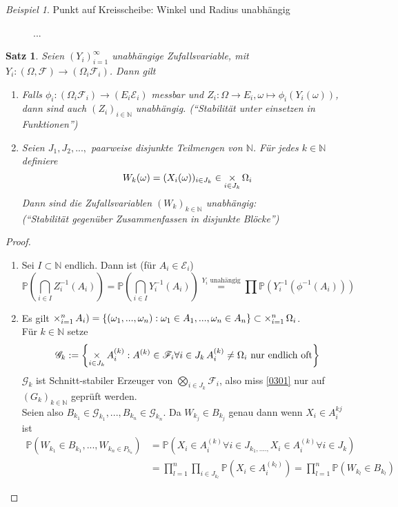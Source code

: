 \documentclass[10pt,a4paper]{article}
\newcommand{\N}{\ensuremath{\mathbb{N}}}
\newcommand{\bigtimes}{\operatornamewithlimits{\times}}
\newcommand{\Prb}{\mathbb P}
\newcommand{\scE}{\mathscr E}
\newcommand{\scF}{\ensuremath{\mathscr{F}}}
\newcommand{\scG}{\mathscr G}
\theoremstyle{plain}
\newtheorem{satz}[theorem]{Satz}
\theoremstyle{definition}
\theoremstyle{remark}
\newtheorem{exm}[theorem]{Beispiel}
\begin{document}
	\begin{exm}
		Punkt auf Kreisscheibe: Winkel und Radius unabhängig %
	\end{exm}
	
	\begin{figure}[h]
		\centering
		\caption{...}
	\end{figure}
	\begin{satz}\label{0318satz}
		Seien $(Y_i)_{i=1}^\infty$ unabhängige Zufallsvariable, mit $Y_i:(\Omega,\scF)\to(\Omega_i\scF_i)$. Dann gilt
		
		\begin{enumerate}
			\item Falls $\phi_i:(\Omega_i\scF_i)\to(E_i\scE_i)$ messbar und $Z_i:\Omega\to E_i,\omega\mapsto\phi_i(Y_i(\omega))$, dann sind auch $(Z_i)_{i\in\N}$ unabhängig. (\enquote{Stabilität unter einsetzen in Funktionen})
			\item Seien $J_1,J_2,...,$ paarweise disjunkte Teilmengen von $\N$. Für jedes $k\in\N$ definiere
			\[W_k(\omega)=(X_i(\omega))_{i\in J_k}\in \bigtimes_{i\in J_k}\Omega_i\]
			Dann sind die Zufallsvariablen $(W_k)_{k\in\N}$ unabhängig:\\
			(\enquote{Stabilität gegenüber Zusammenfassen in disjunkte Blöcke})
		\end{enumerate}
	\end{satz}
	\begin{proof}
		\begin{enumerate}[label=\alph*)]
			\item Sei $I\subset\N$ endlich. Dann ist (für $A_i\in\scE_i$)
			\[\Prb\left(\bigcap_{i\in I}Z^{-1}_i(A_i)\right)=\Prb\left(\bigcap_{i\in I}Y^{-1}_i(A_i)\right)\overset{\text{$Y_i$ unahängig}}{=}\prod\Prb(Y^{-1}_i(\phi^{-1}(A_i)))\]
			\item Es gilt $\bigtimes_{i=1}^nA_i)=\{(\omega_1,...,\omega_n):\omega_1\in A_1,...,\omega_n\in A_n\}\subset\bigtimes_{i=1}^n\Omega_i$.\\
			Für $k\in \N$ setze
			\[\scG_k:=\left\{\bigtimes_{i\in J_k}A_i^{(k)}:A^{(k)}\in\scF_i\forall i\in J_k\,A_i^{(k)}\neq \Omega_i\text{ nur endlich oft}\right\}\]
			$\scG_k$ ist Schnitt-stabiler Erzeuger von $\bigotimes_{i\in J_k}\scF_i$, also miss \ref{0301} nur auf $(G_k)_{k\in\N}$ geprüft werden.\\
			Seien also $B_{k_1}\in\scG_{k_1},...,B_{k_n}\in\scG_{k_n}$. Da $W_{k_j}\in B_{k_j}$ genau dann wenn $X_i\in A_i^{kj}$ ist
			\begin{align*}
			\Prb(W_{k_1}\in B_{k_1},...,W_{k_n\in P_{k_n}})&=\Prb(X_i\in A_i^{(k)}\forall i\in J_{k_1,....,}X_i\in A_{i}^{(k)}\forall
			i\in J_k)\\
			&=\prod_{l=1}^n\prod_{i\in J_{k_l}}\Prb(X_i\in A_i^{(k_l)})=\prod_{l=1}^n\Prb(W_{k_l}\in B_{k_l})
			\end{align*}
		\end{enumerate}
	\end{proof}
\end{document}
